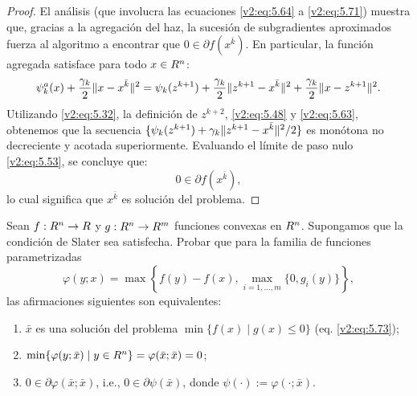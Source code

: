 \begin{proof}
    El análisis (que involucra las ecuaciones \eqref{v2:eq:5.64} a \eqref{v2:eq:5.71}) muestra que, gracias a la agregación del haz, la sucesión de subgradientes aproximados fuerza al algoritmo a encontrar que $0 \in \partial f(x^{\bar{k}})$. 
    En particular, la función agregada satisface para todo $x \in R^n$:
    \begin{equation}
        \psi_k^a(x) + \frac{\gamma_k}{2}\lVert x - x^{\bar{k}}\rVert^2 = \psi_k(z^{k+1}) + \frac{\gamma_k}{2}\lVert z^{k+1} - x^{\bar{k}}\rVert^2 + \frac{\gamma_k}{2}\lVert x - z^{k+1}\rVert^2.
        \label{v2:eq:5.64}
    \end{equation}
    Utilizando \eqref{v2:eq:5.32}, la definición de $z^{k+2}$, \eqref{v2:eq:5.48} y \eqref{v2:eq:5.63}, obtenemos que la secuencia $\{\psi_k(z^{k+1}) + \gamma_k \lVert z^{k+1} - x^{\bar{k}}\rVert^2 / 2\}$ es monótona no decreciente y acotada superiormente. Evaluando el límite de paso nulo \eqref{v2:eq:5.53}, se concluye que:
    \begin{equation}
        0 \in \partial f(x^{\bar{k}}),
        \label{v2:eq:5.70}
    \end{equation}
    lo cual significa que $x^{\bar{k}}$ es solución del problema.
\end{proof}

\begin{exercise}\label{v2:ejer:5.3.1}
    Sean $f : R^n \to R$ y $g : R^n \to R^m$ funciones convexas en $R^n$. Supongamos que la condición de Slater sea satisfecha.
    Probar que para la familia de funciones parametrizadas 
    \begin{equation}
        \varphi(y; x) = \max \left\{ f(y) - f(x), \max_{i=1,\dots,m} \{0, g_i(y)\} \right\},
        \label{v2:eq:5.75}
    \end{equation}
    las afirmaciones siguientes son equivalentes:
    \begin{enumerate}[label=(\alph*)]
        \item $\bar{x}$ es una solución del problema $\min \{f(x) \mid g(x) \le 0\}$ (eq. \eqref{v2:eq:5.73});
        \item $\min \{ \varphi(y; \bar{x}) \mid y \in R^n \} = \varphi(\bar{x}; \bar{x}) = 0$;
        \item $0 \in \partial \varphi(\bar{x}; \bar{x})$, i.e., $0 \in \partial \psi(\bar{x})$, donde $\psi(\cdot) := \varphi(\cdot; \bar{x})$.
    \end{enumerate}
\end{exercise}